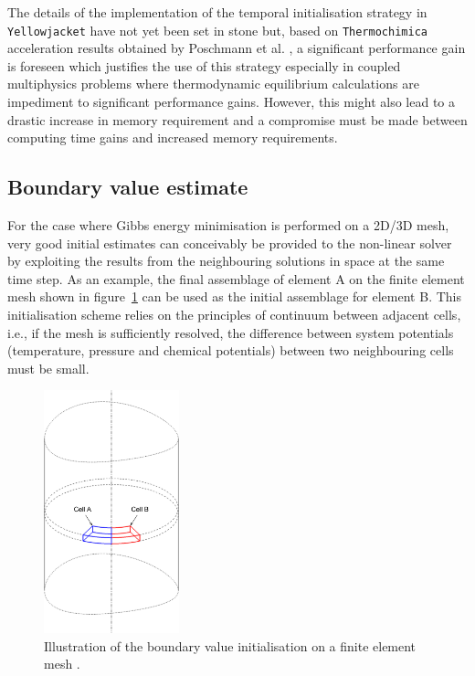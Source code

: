 	The details of the implementation of the temporal initialisation strategy in \texttt{Yellowjacket} have not yet been set in stone but, based on \texttt{Thermochimica} acceleration results obtained by Poschmann et al. \cite{Poschmann:2019aa} , a significant performance gain is foreseen which justifies the use of this strategy especially in coupled multiphysics problems where thermodynamic equilibrium calculations are impediment to significant performance gains. However, this might also lead to a drastic increase in memory requirement and a compromise must be made between  computing time gains and increased memory requirements. 
		
	\subsection{Boundary value estimate}
	For the case where Gibbs energy minimisation is performed on a 2D/3D mesh, very good initial estimates can conceivably be provided to the non-linear solver by exploiting the results from the neighbouring solutions in space at the same time step. As an example, the final assemblage of element A on the finite element mesh shown in figure~\ref{fig:BV_Illustration} can be used as the initial assemblage for element B. This initialisation scheme relies on the principles of continuum between adjacent cells, i.e., if the mesh is sufficiently resolved, the difference between system potentials (temperature, pressure and chemical potentials) between two neighbouring cells must be small. 
	\begin{figure}[htbp]
		\centering
		\includegraphics[width=0.35\textwidth]{figures/BV_FEM}
		\caption{Illustration of the boundary value initialisation on a finite element mesh \cite{Piro17}.}
		\label{fig:BV_Illustration}
	\end{figure}
	
